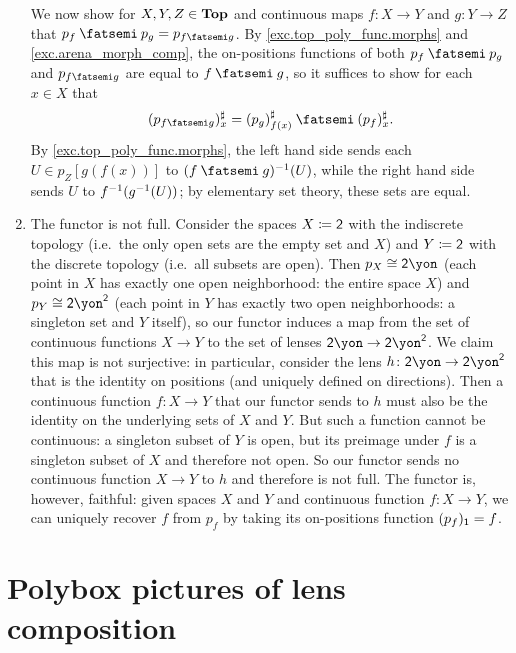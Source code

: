 \documentclass[Book-Poly]{subfiles}
\begin{document}
\begin{exercise}
\begin{solution}
\begin{enumerate}
	We now show for $X,Y,Z\in\mathbf{Top}$ and continuous maps $f\colon X\to Y$ and $g\colon Y\to Z$ that $p_f\then p_g = p_{f\then g}$.
	By \cref{exc.top_poly_func.morphs} and \cref{exc.arena_morph_comp}, the on-positions functions of both $p_f\then p_g$ and $p_{f\then g}$ are equal to $f\then g$, so it suffices to show for each $x\in X$ that
	\[
	    (p_{f \then g})^\sharp_x = (p_g)^\sharp_{f(x)} \then (p_f)^\sharp_x.
	\]
	By \cref{exc.top_poly_func.morphs}, the left hand side sends each $U\in p_Z[g(f(x))]$ to $(f \then g)\inv(U)$, while the right hand side sends $U$ to $f^{-1}(g^{-1}(U))$; by elementary set theory, these sets are equal.

	\item The functor is not full.
	Consider the spaces $X\coloneqq\textsf{2}$ with the indiscrete topology (i.e.\ the only open sets are the empty set and $X$) and $Y\coloneqq\textsf{2}$ with the discrete topology (i.e.\ all subsets are open).
	Then $p_X\iso\2\yon$ (each point in $X$ has exactly one open neighborhood: the entire space $X$) and $p_Y\iso\2\yon^\2$ (each point in $Y$ has exactly two open neighborhoods: a singleton set and $Y$ itself), so our functor induces a map from the set of continuous functions $X\to Y$ to the set of lenses $\2\yon\to\2\yon^\2$.
	We claim this map is not surjective: in particular, consider the lens $h\colon\2\yon\to\2\yon^\2$ that is the identity on positions (and uniquely defined on directions).
	Then a continuous function $f\colon X\to Y$ that our functor sends to $h$ must also be the identity on the underlying sets of $X$ and $Y$.
	But such a function cannot be continuous: a singleton subset of $Y$ is open, but its preimage under $f$ is a singleton subset of $X$ and therefore not open.
	So our functor sends no continuous function $X\to Y$ to $h$ and therefore is not full.
	The functor is, however, faithful: given spaces $X$ and $Y$ and continuous function $f\colon X\to Y$, we can uniquely recover $f$ from $p_f$ by taking its on-positions function $(p_f)_{\textsf{1}}=f$.
\end{enumerate}
\end{solution}
\end{exercise}

\section{Polybox pictures of lens composition}
\end{document}

